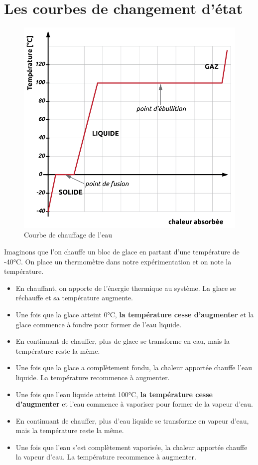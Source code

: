 \documentclass[
  11pt,
  a4paper,
  openany]{book}
\providecommand{\tightlist}{%
  \setlength{\itemsep}{0pt}\setlength{\parskip}{0pt}}
\begin{document}
\section{Les courbes de changement d'état}\label{les-courbes-de-changement-duxe9tat}

\begin{figure}

{\centering \includegraphics[width=0.4\linewidth]{images/courbe-chgt-etat} 

}

\caption{Courbe de chauffage de l'eau}\label{fig:courbe-chgt-etat}
\end{figure}

Imaginons que l'on chauffe un bloc de glace en partant d'une température de -40°C. On place un thermomètre dans notre expérimentation et on note la température.

\begin{itemize}
\tightlist
\item
  En chauffant, on apporte de l'énergie thermique au système. La glace se réchauffe et sa température augmente.
\item
  Une fois que la glace atteint 0°C, \textbf{la température cesse d'augmenter} et la glace commence à fondre pour former de l'eau liquide.
\item
  En continuant de chauffer, plus de glace se transforme en eau, mais la température reste la même.
\item
  Une fois que la glace a complètement fondu, la chaleur apportée chauffe l'eau liquide.
  La température recommence à augmenter.
\item
  Une fois que l'eau liquide atteint 100°C, \textbf{la température cesse d'augmenter} et l'eau commence à vaporiser pour former de la vapeur d'eau.
\item
  En continuant de chauffer, plus d'eau liquide se transforme en vapeur d'eau, mais la température reste la même.
\item
  Une fois que l'eau s'est complètement vaporisée, la chaleur apportée chauffe la vapeur d'eau.
  La température recommence à augmenter.
\end{itemize}
\end{document}
